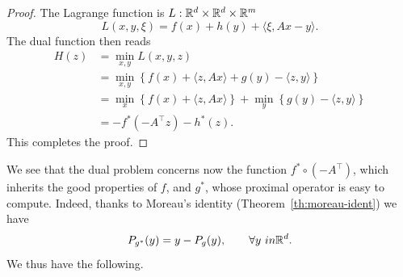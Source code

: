 \documentclass{report}
\begin{document}

\begin{proof}
	The Lagrange function is $L:\mathbb{R}^d\times\mathbb{R}^d\times \mathbb{R}^m$
	\begin{equation}
		L(x,y,\xi) = f(x)+h(y) +\langle \xi, Ax-y\rangle.
	\end{equation}
	The dual function then reads
	\begin{equation}
		\begin{aligned}
			H(z) 
			&= \min_{x,y} L(x,y,z) \\
			&= \min_{x,y} \left\{ f(x) + \langle z, Ax \rangle + g(y) - \langle z, y \rangle \right\} \\
			&= \min_{x} \left\{ f(x) + \langle z, Ax \rangle \right\} 
			   + \min_{y} \left\{ g(y) - \langle z, y \rangle \right\} \\
			&= - f^*(-A^\top z) - h^*(z).
		\end{aligned}
	\end{equation}
	This completes the proof.
\end{proof}

We see that the dual problem concerns now the function $f^*\circ (-A^\top)$, which inherits the good properties of $f$, and $g^*$, whose proximal operator is easy to compute. Indeed, thanks to Moreau's identity (Theorem~\ref{th:moreau-ident}) we have 
\begin{equation}
	P_{g^*}(y) = y - P_g(y), \qquad \forall y\ in \mathbb{R}^d.
\end{equation}
We thus have the following.

\end{document}
